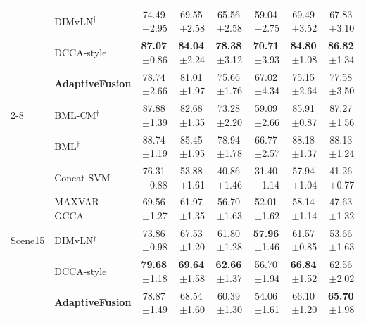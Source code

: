 \begin{table}[!t]
\begin{tabular}{llcccccc}
 & DIMvLN$^\dagger$ & 74.49\,{\scriptsize$\pm$2.95} & 69.55\,{\scriptsize$\pm$2.58} & 65.56\,{\scriptsize$\pm$2.58} & 59.04\,{\scriptsize$\pm$2.75} & 69.49\,{\scriptsize$\pm$3.52} & 67.83\,{\scriptsize$\pm$3.10} \\
 & DCCA-style & \textbf{87.07}\,{\scriptsize$\pm$0.86} & \textbf{84.04}\,{\scriptsize$\pm$2.24} & \textbf{78.38}\,{\scriptsize$\pm$3.12} & \textbf{70.71}\,{\scriptsize$\pm$3.93} & \textbf{84.80}\,{\scriptsize$\pm$1.08} & \textbf{86.82}\,{\scriptsize$\pm$1.34} \\
 & \textbf{AdaptiveFusion} & 78.74\,{\scriptsize$\pm$2.66} & 81.01\,{\scriptsize$\pm$1.97} & 75.66\,{\scriptsize$\pm$1.76} & 67.02\,{\scriptsize$\pm$4.34} & 75.15\,{\scriptsize$\pm$2.64} & 77.58\,{\scriptsize$\pm$3.50} \\
\cmidrule(lr){2-8}
 & BML-CM$^\dagger$ & 87.88\,{\scriptsize$\pm$1.39} & 82.68\,{\scriptsize$\pm$1.35} & 73.28\,{\scriptsize$\pm$2.20} & 59.09\,{\scriptsize$\pm$2.66} & 85.91\,{\scriptsize$\pm$0.87} & 87.27\,{\scriptsize$\pm$1.56} \\
 & BML$^\dagger$ & 88.74\,{\scriptsize$\pm$1.19} & 85.45\,{\scriptsize$\pm$1.95} & 78.94\,{\scriptsize$\pm$1.78} & 66.77\,{\scriptsize$\pm$2.57} & 88.18\,{\scriptsize$\pm$1.37} & 88.13\,{\scriptsize$\pm$1.24} \\
\midrule
\multirow{7}{*}{Scene15} & Concat-SVM & 76.31\,{\scriptsize$\pm$0.88} & 53.88\,{\scriptsize$\pm$1.61} & 40.86\,{\scriptsize$\pm$1.46} & 31.40\,{\scriptsize$\pm$1.14} & 57.94\,{\scriptsize$\pm$1.04} & 41.26\,{\scriptsize$\pm$0.77} \\
 & MAXVAR-GCCA & 69.56\,{\scriptsize$\pm$1.27} & 61.97\,{\scriptsize$\pm$1.35} & 56.70\,{\scriptsize$\pm$1.63} & 52.01\,{\scriptsize$\pm$1.62} & 58.14\,{\scriptsize$\pm$1.14} & 47.63\,{\scriptsize$\pm$1.32} \\
 & DIMvLN$^\dagger$ & 73.86\,{\scriptsize$\pm$0.98} & 67.53\,{\scriptsize$\pm$1.20} & 61.80\,{\scriptsize$\pm$1.28} & \textbf{57.96}\,{\scriptsize$\pm$1.46} & 61.57\,{\scriptsize$\pm$0.85} & 53.66\,{\scriptsize$\pm$1.63} \\
 & DCCA-style & \textbf{79.68}\,{\scriptsize$\pm$1.18} & \textbf{69.64}\,{\scriptsize$\pm$1.58} & \textbf{62.66}\,{\scriptsize$\pm$1.37} & 56.70\,{\scriptsize$\pm$1.94} & \textbf{66.84}\,{\scriptsize$\pm$1.52} & 62.56\,{\scriptsize$\pm$2.02} \\
 & \textbf{AdaptiveFusion} & 78.87\,{\scriptsize$\pm$1.49} & 68.54\,{\scriptsize$\pm$1.60} & 60.39\,{\scriptsize$\pm$1.30} & 54.06\,{\scriptsize$\pm$1.61} & 66.10\,{\scriptsize$\pm$1.20} & \textbf{65.70}\,{\scriptsize$\pm$1.98} \\

\end{tabular}
\end{table}
